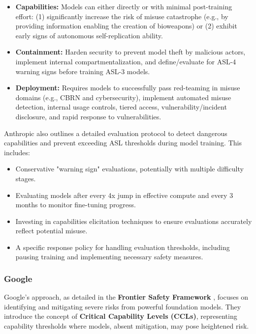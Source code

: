 \begin{itemize}
    \item \textbf{Capabilities:} Models can either directly or with minimal post-training effort: (1) significantly increase the risk of misuse catastrophe (e.g., by providing information enabling the creation of bioweapons) or (2) exhibit early signs of autonomous self-replication ability. 
    \item \textbf{Containment:} Harden security to prevent model theft by malicious actors, implement internal compartmentalization, and define/evaluate for ASL-4 warning signs before training ASL-3 models.
    \item \textbf{Deployment:} Requires models to successfully pass red-teaming in misuse domains (e.g., CBRN and cybersecurity), implement automated misuse detection, internal usage controls, tiered access, vulnerability/incident disclosure, and rapid response to vulnerabilities.
\end{itemize}

Anthropic also outlines a detailed evaluation protocol to detect dangerous capabilities and prevent exceeding ASL thresholds during model training. This includes:

\begin{itemize}
    \item Conservative "warning sign" evaluations, potentially with multiple difficulty stages.
    \item Evaluating models after every 4x jump in effective compute and every 3 months to monitor fine-tuning progress.
    \item Investing in capabilities elicitation techniques to ensure evaluations accurately reflect potential misuse.
    \item A specific response policy for handling evaluation thresholds, including pausing training and implementing necessary safety measures.
\end{itemize}

\subsubsection{Google}

Google's approach, as detailed in the \textbf{Frontier Safety Framework} , focuses on identifying and mitigating severe risks from powerful foundation models. They introduce the concept of \textbf{Critical Capability Levels (CCLs)}, representing capability thresholds where models, absent mitigation, may pose heightened risk.

